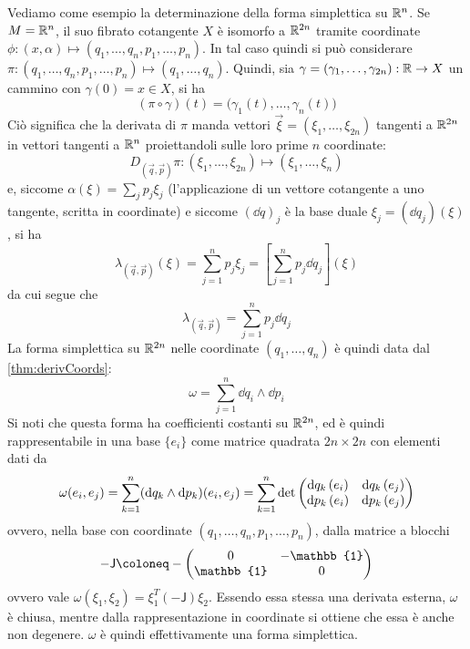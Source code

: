 Vediamo come esempio la determinazione della forma simplettica su $\mathbb{R}^{n}$. Se $M = \mathbb{R}^{n}$, il suo fibrato cotangente $X$ è isomorfo a $\mathbb{R}^{2n}$ tramite coordinate $\phi: (x, \alpha) \mapsto (q_1, \ldots, q_n, p_1, \ldots, p_n)$. In tal caso quindi si può considerare $\pi: (q_1, \ldots, q_n, p_1, \ldots, p_n) \mapsto  (q_1, \ldots, q_n)$. Quindi, sia $\gamma = (\gamma_1, \ldots, \gamma_{2n}):\mathbb{R} \to X$ un cammino con $\gamma(0) = x \in X$, si ha \begin{equation}
(\pi \circ {\gamma}) (t) = \big({\gamma}_1(t), \ldots, {\gamma}_n (t)\big)
\end{equation} 
Ciò significa che la derivata di $\pi$ manda vettori $\vec{\xi} = (\xi_1, \ldots, \xi_{2n})$ tangenti a $\mathbb{R}^{2n}$ in vettori tangenti a $\mathbb{R}^{n}$ proiettandoli sulle loro prime $n$ coordinate:
\begin{equation}
  D_{(\vec{q},\vec{p})}\pi: (\xi_1, \ldots, \xi_{2n}) \mapsto  (\xi_1, \ldots, \xi_n)
\end{equation}
e, siccome $\alpha(\xi) = \sum_j p_j \xi_j$ (l'applicazione di un vettore cotangente a uno tangente, scritta in coordinate) e siccome $(\dd{q})_j$ è la base duale $\xi_j = (\dd{q}_j)(\xi)$, si ha \begin{equation}
\lambda_{(\vec{q},\vec{p})} (\xi) = \sum_{j=1}^n p_j \xi_j = \left[\sum_{j=1}^n p_j \dd{q_j}\right] (\xi)
\end{equation} 
da cui segue che \begin{equation}
  \lambda_{(\vec{q},\vec{p})} = \sum_{j=1}^n p_j \dd{q_j}
\end{equation} 
La forma simplettica su $\mathbb{R}^{2n}$ nelle coordinate $(q_1, \ldots, q_n)$ è quindi data dal \autoref{thm:derivCoords}: 
\begin{equation} \label{eq:R2nSympForm}
\omega = \sum_{j=1}^n \dd{q_i} \wedge \dd{p_i}
\end{equation} 
Si noti che questa forma ha coefficienti costanti su $\mathbb{R}^{2n}$, ed è quindi rappresentabile in una base $\{e_i\}$ come matrice quadrata $2n \times 2n$ con elementi dati da 
\begin{equation}
\omega(e_i, e_j) = \sum_{k=1}^{n} (\dd{q_k} \wedge \dd{p_k})(e_i, e_j) = \sum_{k=1}^{n} \det\pmqty{\dd{q_k}(e_i) & \dd{q_k}(e_j) \\\dd{p_k}(e_i) & \dd{p_k}(e_j)}
\end{equation}
ovvero, nella base con coordinate $(q_1, \ldots, q_n, p_1, \ldots, p_n)$, dalla matrice a blocchi
\begin{equation}
- \mathsf{J} \defeq - \pmqty{0 & -\mathbb{1} \\ \mathbb{1} & 0}
\end{equation} 
ovvero vale $\omega(\xi_1, \xi_2) = \xi_1^T (-\mathsf{J}) \xi_2$. Essendo essa stessa una derivata esterna, $\omega$ è chiusa, mentre dalla rappresentazione in coordinate si ottiene che essa è anche non degenere. $\omega$ è quindi effettivamente una forma simplettica.

